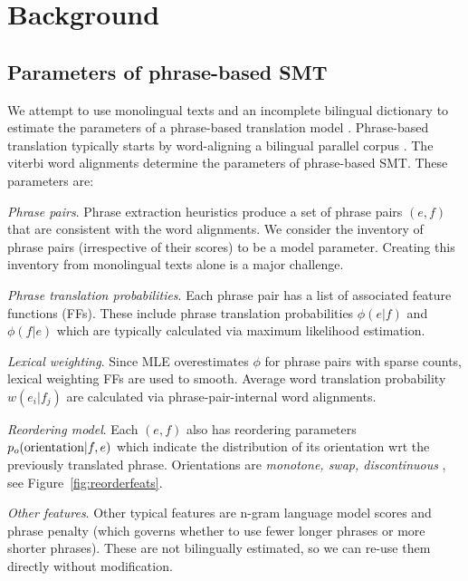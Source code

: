 \documentclass[11pt]{article}
\newcommand{\figref}[1]{Figure~\ref{#1}}
\newenvironment{my_itemize}{
\begin{itemize}
  \setlength{\itemsep}{2pt}
  \setlength{\parskip}{2pt}
  \setlength{\parsep}{1pt}}{\end{itemize}
}
\begin{document}

\section{Background} \label{sect:bckg}
\subsection{Parameters of phrase-based SMT} \label{sect:bckg:smt}

We attempt to use monolingual texts and an incomplete bilingual dictionary to estimate the parameters of a phrase-based translation  model \cite{Koehn:2003,Moses}.  Phrase-based translation typically starts by word-aligning a bilingual parallel corpus \cite{Och2003}.  The viterbi word alignments determine the parameters of phrase-based SMT.  These parameters are:

\begin{my_itemize}
\item \emph{Phrase pairs}.  
Phrase extraction heuristics \cite{Venugopal2003,Tillmann2003,Och2004} produce a set of phrase pairs $(e, f)$ that are consistent with the word alignments.  We consider the inventory of phrase pairs (irrespective of their scores) to be a model parameter.  
Creating this inventory from monolingual texts alone is a major challenge.

\item \emph{Phrase translation probabilities}.  Each phrase pair has a list of associated feature functions (FFs).  These include phrase translation probabilities ${\phi(e|f)}$ and ${\phi(f|e)}$ which are  typically calculated via maximum likelihood estimation. 

\item \emph{Lexical weighting}.  Since MLE overestimates ${\phi}$ for phrase pairs with sparse counts, lexical weighting FFs are used to smooth.  Average word translation probability ${w(e_i|f_j)}$ are calculated via phrase-pair-internal word alignments.

\item \emph{Reordering model}.  Each $(e, f)$ also has reordering parameters $p_o(\textnormal{orientation}|f,e)$ which indicate the distribution of its orientation wrt the previously translated phrase. Orientations are {\it monotone, swap, discontinuous} \cite{tillman:2004:HLTNAACL,Kumar2004}, see \figref{fig:reorderfeats}. 

\item \emph{Other features}. Other typical features are n-gram language model scores and phrase penalty (which governs whether to use fewer longer phrases or more shorter phrases).  These are not bilingually estimated, so we can re-use them directly without modification. 
\end{my_itemize}
\end{document}
